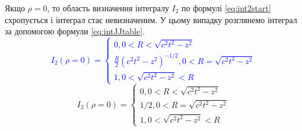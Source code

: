 Якщо $ \rho = 0 $, то область визначення інтегралу $ I_2 $ по формулі 
\eqref{eq:int2start} схропується і інтеграл стає невизначеним. У цьому випадку 
розглянемо інтеграл за допомогою формули \eqref{eq:intJJtable}.
%
\textcolor{blue}{ \begin{equation*}
I_2 \left( \rho = 0 \right) = \begin{cases}
0, 0 < R < \sqrt{c^2t^2 - z^2} \\
\frac{R}{2} \left( c^2t^2 - z^2 \right)^{-1/2}, 0 < R = \sqrt{c^2t^2 - z^2} \\ 
1, 0 < \sqrt{c^2t^2 - z^2} < R 
\end{cases}
\end{equation*} }
%
\begin{equation}
I_2 \left( \rho = 0 \right) = \begin{cases}
0, 0 < R < \sqrt{c^2t^2 - z^2} \\
1/2, 0 < R = \sqrt{c^2t^2 - z^2} \\ 
1, 0 < \sqrt{c^2t^2 - z^2} < R 
\end{cases}
\end{equation}
